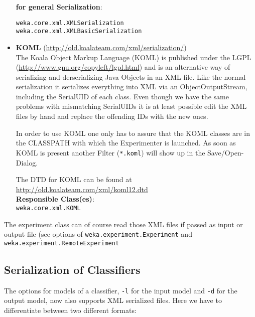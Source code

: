 \begin{itemize}
\noindent \textbf{for general Serialization}:

\begin{verbatim}
weka.core.xml.XMLSerialization
weka.core.xml.XMLBasicSerialization 
\end{verbatim}

\item \textbf{KOML} (\url{http://old.koalateam.com/xml/serialization/}{})\\
The Koala Object Markup Language (KOML) is published under the LGPL
(\url{http://www.gnu.org/copyleft/lgpl.html}{}) and is an alternative way of
serializing and derserializing Java Objects in an XML file. Like the
normal serialization it serializes everything into XML via an
ObjectOutputStream, including the SerialUID of each class. Even though
we have the same problems with mismatching SerialUIDs it is at least
possible edit the XML files by hand and replace the offending IDs with
the new ones.

In order to use KOML one only has to assure that the KOML classes are
in the CLASSPATH with which the Experimenter is launched. As soon as
KOML is present another Filter (\verb=*.koml=) will show up in the
Save/Open-Dialog.

The DTD for KOML can be found at \url{http://old.koalateam.com/xml/koml12.dtd}{}\\

\noindent \textbf{Responsible Class(es)}:\\

\verb=weka.core.xml.KOML=\\
\end{itemize}

\noindent The experiment class can of course read those XML files if passed as
input or output file (see options of \verb=weka.experiment.Experiment= and
\verb=weka.experiment.RemoteExperiment=

\subsection{Serialization of Classifiers}
The options for models of a classifier, \verb=-l= for the input model and \verb=-d=
for the output model, now also supports XML serialized files. Here we
have to differentiate between two different formats:

